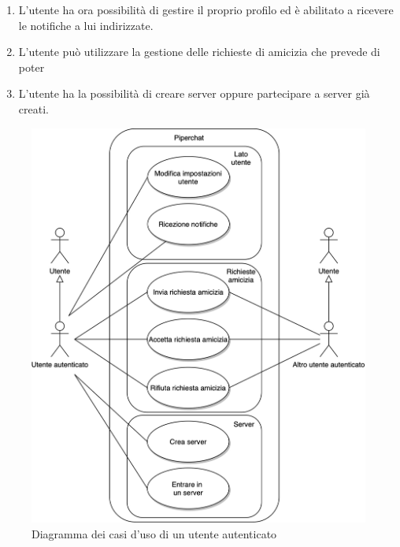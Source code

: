 \begin{enumerate}
    \item L'utente ha ora possibilità di gestire il proprio profilo ed è abilitato a ricevere le notifiche a lui indirizzate.

    \item L'utente può utilizzare la gestione delle richieste di amicizia che prevede di poter 
        
    \item L'utente ha la possibilità di creare server oppure partecipare a server già creati.
\end{enumerate}

\begin{figure}[H]
    \centering
    \includegraphics[width=1\linewidth]{sections/01-goal/img/use-cases/piperchat-Casi d'uso-2.jpg}
    \caption{Diagramma dei casi d'uso di un utente autenticato}
\end{figure}

